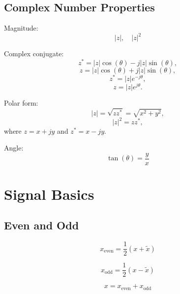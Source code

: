 \documentclass{article}
\begin{document}
\subsection{Complex Number Properties}
\begin{definition}
    Magnitude:
    \begin{equation*}
        |z|, \quad |z|^2
    \end{equation*}

    Complex conjugate:
    \begin{equation*}
        z^* = |z| \cos(\theta) - j |z| \sin(\theta),
    \end{equation*}
    \begin{equation*}
        z = |z| \cos(\theta) + j |z| \sin(\theta),
    \end{equation*}
    \begin{equation*}
        z^* = |z| e^{-j\theta},
    \end{equation*}
    \begin{equation*}
        z = |z| e^{j\theta}.
    \end{equation*}

    Polar form:
    \begin{equation*}
        |z| = \sqrt{z z^*} = \sqrt{x^2 + y^2},
    \end{equation*}
    \begin{equation*}
        |z|^2 = z z^*,
    \end{equation*}
    where \( z = x + jy \) and \( z^* = x - jy \).

    Angle:
    \begin{equation*}
        \tan(\theta) = \frac{y}{x}
    \end{equation*}
\end{definition}

\section{Signal Basics}
\subsection{Even and Odd}
\begin{definition}
    \begin{equation*}
        x_{\text{even}} = \frac{1}{2}(x + \tilde{x})
    \end{equation*}
    
    \begin{equation*}
        x_{\text{odd}} = \frac{1}{2}(x - \tilde{x})
    \end{equation*}
    
    \begin{equation*}
        x = x_{\text{even}} + x_{\text{odd}}
    \end{equation*}
\end{definition}
\end{document}
